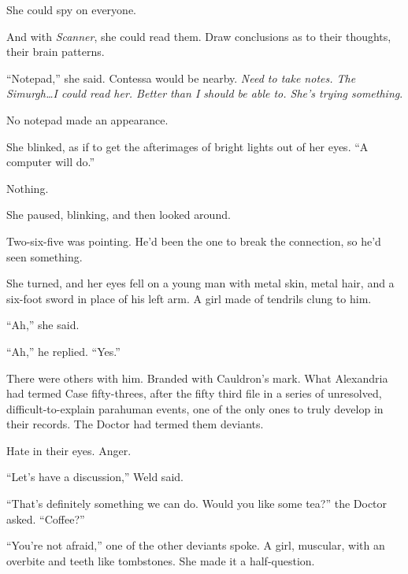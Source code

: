 She could spy on everyone.



And with \emph{Scanner}, she could read them.  Draw conclusions as to their thoughts, their brain patterns.



``Notepad,'' she said.  Contessa would be nearby.  \emph{Need to take notes.  The Simurgh\ldots I could read her.  Better than I should be able to.  She's trying something}.



No notepad made an appearance.



She blinked, as if to get the afterimages of bright lights out of her eyes.  ``A computer will do.''



Nothing.



She paused, blinking, and then looked around.



Two-six-five was pointing.  He'd been the one to break the connection, so he'd seen something.



She turned, and her eyes fell on a young man with metal skin, metal hair, and a six-foot sword in place of his left arm.  A girl made of tendrils clung to him.



``Ah,'' she said.



``Ah,'' he replied.  ``Yes.''



There were others with him.  Branded with Cauldron's mark.  What Alexandria had termed Case fifty-threes, after the fifty third file in a series of unresolved, difficult-to-explain parahuman events, one of the only ones to truly develop in their records.  The Doctor had termed them deviants.



Hate in their eyes.  Anger.



``Let's have a discussion,'' Weld said.



``That's definitely something we can do.  Would you like some tea?'' the Doctor asked.  ``Coffee?''



``You're not afraid,'' one of the other deviants spoke.  A girl, muscular, with an overbite and teeth like tombstones.  She made it a half-question.



